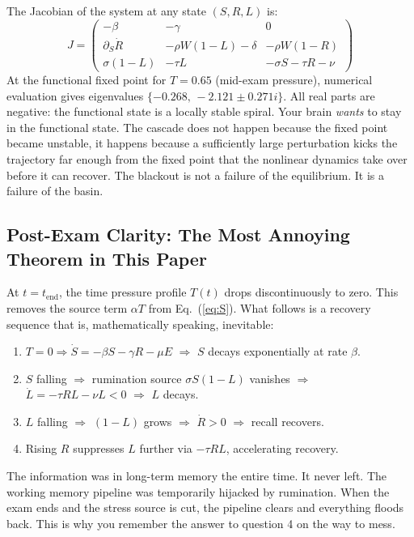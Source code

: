 \documentclass[11pt,a4paper]{article}
\begin{document}
The Jacobian of the system at any state $(S, R, L)$ is:
\begin{equation}
  J =
  \begin{pmatrix}
    -\beta & -\gamma & 0 \\[4pt]
    \partial_S\dot{R} & -\rho W(1-L) - \delta & -\rho W(1-R) \\[4pt]
    \sigma(1-L) & -\tau L & -\sigma S - \tau R - \nu
  \end{pmatrix}
  \label{eq:jacobian}
\end{equation}
At the functional fixed point for $T = 0.65$ (mid-exam pressure),
numerical evaluation gives eigenvalues $\{-0.268,\, -2.121 \pm
0.271i\}$. All real parts are negative: the functional state is a
locally stable spiral. Your brain \emph{wants} to stay in the
functional state. The cascade does not happen because the fixed
point became unstable, it happens because a sufficiently large
perturbation kicks the trajectory far enough from the fixed point
that the nonlinear dynamics take over before it can recover.
The blackout is not a failure of the equilibrium. It is a failure
of the basin.

\subsection{Post-Exam Clarity: The Most Annoying Theorem in This Paper}

At $t = t_{\mathrm{end}}$, the time pressure profile $T(t)$ drops
discontinuously to zero. This removes the source term $\alpha T$
from Eq.~(\ref{eq:S}). What follows is a recovery sequence that
is, mathematically speaking, inevitable:

\begin{enumerate}
  \item $T = 0 \Rightarrow \dot{S} = -\beta S - \gamma R - \mu E$
    $\Rightarrow$ $S$ decays exponentially at rate $\beta$.
  \item $S$ falling $\Rightarrow$ rumination source $\sigma S(1-L)$
    vanishes $\Rightarrow$ $\dot{L} = -\tau RL - \nu L < 0$
    $\Rightarrow$ $L$ decays.
  \item $L$ falling $\Rightarrow$ $(1-L)$ grows $\Rightarrow$
    $\dot{R} > 0$ $\Rightarrow$ recall recovers.
  \item Rising $R$ suppresses $L$ further via $-\tau RL$,
    accelerating recovery.
\end{enumerate}

The information was in long-term memory the entire time. It never
left. The working memory pipeline was temporarily hijacked by
rumination. When the exam ends and the stress source is cut,
the pipeline clears and everything floods back. This is why you
remember the answer to question 4 on the way to mess.
\end{document}
